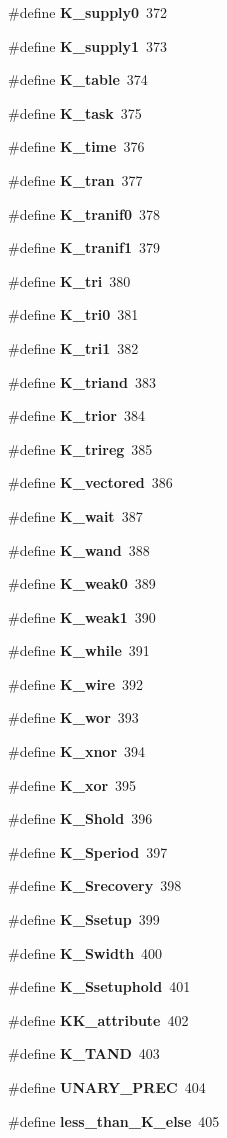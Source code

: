 \begin{CompactItemize}
\#define {\bf K\_\-supply0}\ 372
\item 
\#define {\bf K\_\-supply1}\ 373
\item 
\#define {\bf K\_\-table}\ 374
\item 
\#define {\bf K\_\-task}\ 375
\item 
\#define {\bf K\_\-time}\ 376
\item 
\#define {\bf K\_\-tran}\ 377
\item 
\#define {\bf K\_\-tranif0}\ 378
\item 
\#define {\bf K\_\-tranif1}\ 379
\item 
\#define {\bf K\_\-tri}\ 380
\item 
\#define {\bf K\_\-tri0}\ 381
\item 
\#define {\bf K\_\-tri1}\ 382
\item 
\#define {\bf K\_\-triand}\ 383
\item 
\#define {\bf K\_\-trior}\ 384
\item 
\#define {\bf K\_\-trireg}\ 385
\item 
\#define {\bf K\_\-vectored}\ 386
\item 
\#define {\bf K\_\-wait}\ 387
\item 
\#define {\bf K\_\-wand}\ 388
\item 
\#define {\bf K\_\-weak0}\ 389
\item 
\#define {\bf K\_\-weak1}\ 390
\item 
\#define {\bf K\_\-while}\ 391
\item 
\#define {\bf K\_\-wire}\ 392
\item 
\#define {\bf K\_\-wor}\ 393
\item 
\#define {\bf K\_\-xnor}\ 394
\item 
\#define {\bf K\_\-xor}\ 395
\item 
\#define {\bf K\_\-Shold}\ 396
\item 
\#define {\bf K\_\-Speriod}\ 397
\item 
\#define {\bf K\_\-Srecovery}\ 398
\item 
\#define {\bf K\_\-Ssetup}\ 399
\item 
\#define {\bf K\_\-Swidth}\ 400
\item 
\#define {\bf K\_\-Ssetuphold}\ 401
\item 
\#define {\bf KK\_\-attribute}\ 402
\item 
\#define {\bf K\_\-TAND}\ 403
\item 
\#define {\bf UNARY\_\-PREC}\ 404
\item 
\#define {\bf less\_\-than\_\-K\_\-else}\ 405
\end{CompactItemize}
